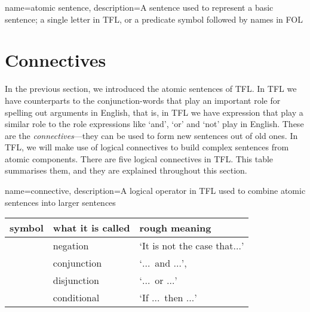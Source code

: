 {
name=atomic sentence,
description={A sentence used to represent a basic sentence; a single letter in TFL, or a predicate symbol followed by names in FOL}
}

\section{Connectives}
\label{s:TFLConnectives}

In the previous section, we introduced the atomic sentences of TFL.  In TFL we have counterparts to the conjunction-words that play an important role for spelling out arguments in English, that is, in TFL we have expression that play a similar role to the role expressions like `and', `or' and `not' play in English. These are the \emph{connectives}---they can be used to form new sentences out of old ones. In TFL, we will make use of logical connectives to build complex sentences from atomic components. There are five logical connectives in TFL. This table summarises them, and they are explained throughout this section.

{
name=connective,
description={A logical operator in TFL used to combine \glspl{atomic sentence} into larger sentences}
}
	\begin{table}[h]
	\center
	\begin{tabular}{l l l}

	\textbf{symbol}&\textbf{what it is called}&\textbf{rough meaning}\\
	\hline
	\enot&negation&`It is not the case that$\ldots$'\\
	\eand&conjunction&`$\ldots$\ and $\ldots$',\\
	\eor&disjunction&`$\ldots$\ or $\ldots$'\\
	\eif&conditional&`If $\ldots$\ then $\ldots$'\\

	\end{tabular}
	\end{table}


